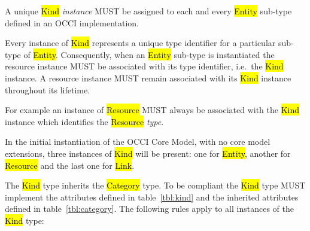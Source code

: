\documentclass[10pt,a4paper]{article}
\begin{document}
A unique \hl{Kind} {\em instance} MUST be assigned to each and every
\hl{Entity} sub-type defined in an OCCI implementation.

Every instance of \hl{Kind} represents a unique type identifier for a
particular sub-type of \hl{Entity}.  Consequently, when an \hl{Entity}
sub-type is instantiated the resource instance MUST be associated with
its type identifier, i.e.~the \hl{Kind} instance.  A resource instance
MUST remain associated with its \hl{Kind} instance throughout its
lifetime.

For example an instance of \hl{Resource} MUST always be associated
with the \hl{Kind} instance which identifies the \hl{Resource} {\em
  type}.

In the initial instantiation of the OCCI Core Model, with no core
model extensions, three instances of \hl{Kind} will be present: one
for \hl{Entity}, another for \hl{Resource} and the last one for
\hl{Link}.


The \hl{Kind} type inherits the \hl{Category} type. To be compliant
the \hl{Kind} type MUST implement the attributes defined in
table~\ref{tbl:kind} and the inherited attributes defined in
table~\ref{tbl:category}. The following rules apply to all instances
of the \hl{Kind} type:
\end{document}
